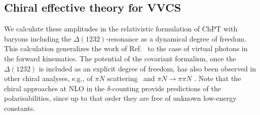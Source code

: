 \documentclass[twocolumn,prc,showpacs,nofootinbib,preprintnumbers,amsmath,amssymb,superscriptaddress]{revtex4-1}
\begin{document}
\subsection{Chiral effective theory for VVCS}
\label{Sec:ChEFT_for_VVCS}

We calculate these amplitudes in the relativistic formulation of ChPT with baryons
including the $\Delta(1232)$-resonance as a dynamical degree of freedom.
This calculation generalizes the work of Ref.~\cite{Lensky:2009uv} to the case of virtual photons in the forward kinematics.
The potential of the covariant formalism, once the $\Delta(1232)$ is included as an explicit degree of freedom,
has also been observed in other chiral analyses, e.g., of $\pi N$ scattering~\cite{Alarcon:2012kn,Chen:2012nx}
and $\pi N \to \pi \pi N$ \cite{Siemens:2014pma}. Note that the chiral approaches at NLO in the $\delta$-counting
provide predictions of the polarisabilities, since up to that order they are free of unknown low-energy constants.
\end{document}
